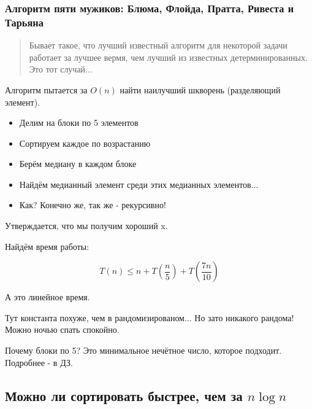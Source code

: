 \documentclass[
]{article}
\begin{document}
\hypertarget{ux430ux43bux433ux43eux440ux438ux442ux43c-ux43fux44fux442ux438-ux43cux443ux436ux438ux43aux43eux432-ux431ux43bux44eux43cux430-ux444ux43bux43eux439ux434ux430-ux43fux440ux430ux442ux442ux430-ux440ux438ux432ux435ux441ux442ux430-ux438-ux442ux430ux440ux44cux44fux43dux430}{%
\subsubsection{Алгоритм пяти мужиков: Блюма, Флойда, Пратта, Ривеста и
Тарьяна}\label{ux430ux43bux433ux43eux440ux438ux442ux43c-ux43fux44fux442ux438-ux43cux443ux436ux438ux43aux43eux432-ux431ux43bux44eux43cux430-ux444ux43bux43eux439ux434ux430-ux43fux440ux430ux442ux442ux430-ux440ux438ux432ux435ux441ux442ux430-ux438-ux442ux430ux440ux44cux44fux43dux430}}

\begin{quote}
Бывает такое, что лучший известный алгоритм для некоторой задачи
работает за лучшее вермя, чем лучший из известных детерминированных. Это
тот случай...
\end{quote}

Алгоритм пытается за \(O(n)\) найти наилучший шкворень (разделяющий
элемент).

\begin{itemize}
\item
  Делим на блоки по 5 элементов
\item
  Сортируем каждое по возрастанию
\item
  Берём медиану в каждом блоке
\item
  Найдём медианный элемент среди этих медианных элементов...
\item
  Как? Конечно же, так же - рекурсивно!
\end{itemize}

Утверждается, что мы получим хороший x.

Найдём время работы:

\[T(n) \leqslant n + T\left(\frac{n}{5}\right) + T\left( \frac{7n}{10} \right)\]

А это линейное время.

Тут константа похуже, чем в рандомизированом... Но зато никакого
рандома! Можно ночью спать спокойно.

Почему блоки по 5? Это минимальное нечётное число, которое подходит.
Подробнее - в ДЗ.

\hypertarget{ux43cux43eux436ux43dux43e-ux43bux438-ux441ux43eux440ux442ux438ux440ux43eux432ux430ux442ux44c-ux431ux44bux441ux442ux440ux435ux435-ux447ux435ux43c-ux437ux430}{%
\subsection{\texorpdfstring{Можно ли сортировать быстрее, чем за
\(n \log n\)}{Можно ли сортировать быстрее, чем за n \textbackslash log n}}\label{ux43cux43eux436ux43dux43e-ux43bux438-ux441ux43eux440ux442ux438ux440ux43eux432ux430ux442ux44c-ux431ux44bux441ux442ux440ux435ux435-ux447ux435ux43c-ux437ux430}}
\end{document}
